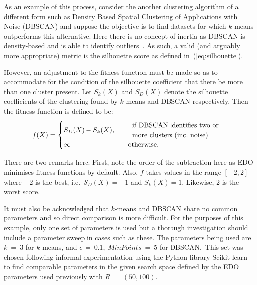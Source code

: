 As an example of this process, consider the another clustering algorithm of a
different form such as Density Based Spatial Clustering of Applications with
Noise (DBSCAN) and suppose the objective is to find datasets for which
\(k\)-means outperforms this alternative. Here there is no concept of inertia as
DBSCAN is density-based and is able to identify outliers~\cite{Ester1996}. As
such, a valid (and arguably more appropriate) metric is the silhouette score as
defined in~(\ref{eq:silhouette}).

However, an adjustment to the fitness function must be made so as to accommodate
for the condition of the silhouette coefficient that there be more than one
cluster present. Let \(S_k (X)\) and \(S_D (X)\) denote the silhouette
coefficients of the clustering found by \(k\)-means and DBSCAN respectively.
Then the fitness function is defined to be:
\begin{equation}
    f(X) = 
        \begin{cases}
            S_D (X) - S_k (X), &\quad \text{%
                \begin{tabular}{l}
                    if DBSCAN identifies two or
                    \\
                    more clusters (inc.\ noise)
                \end{tabular}
            }\\
            \infty &\quad \text{otherwise.}
        \end{cases}\label{equation:dbscan-fitness}
\end{equation}

There are two remarks here. First, note the order of the subtraction here as EDO
minimises fitness functions by default. Also, \(f\) takes values in the range
\([-2, 2]\) where \(-2\) is the best, i.e.\ \(S_D(X) = -1\) and \(S_k(X) = 1\).
Likewise, 2 is the worst score.

It must also be acknowledged that \(k\)-means and DBSCAN share no common
parameters and so direct comparison is more difficult. For the purposes of this
example, only one set of parameters is used but a thorough investigation should
include a parameter sweep in cases such as these. The parameters being used are
\(k~=~3\) for \(k\)-means, and \(\epsilon~=~0.1,\ MinPoints~=~5\) for DBSCAN.\
This set was chosen following informal experimentation using the Python library
Scikit-learn~\cite{scikit} to find comparable parameters in the given search
space defined by the EDO parameters used previously with \(R~=~(50,100)\).

